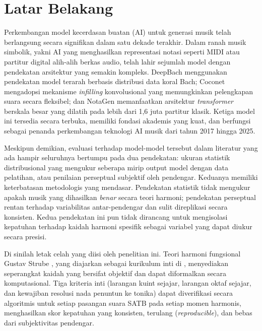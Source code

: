 \section{Latar Belakang}

Perkembangan model kecerdasan buatan (AI) untuk generasi musik telah berlangsung secara signifikan dalam satu dekade terakhir. Dalam ranah musik simbolik, yakni AI yang menghasilkan representasi notasi seperti MIDI atau partitur digital alih-alih berkas audio, telah lahir sejumlah model dengan pendekatan arsitektur yang semakin kompleks. DeepBach \parencite{hadjeres2017} menggunakan pendekatan model terarah berbasis distribusi data koral Bach; Coconet \parencite{huang2017} mengadopsi mekanisme \textit{infilling} konvolusional yang memungkinkan pelengkapan suara secara fleksibel; dan NotaGen \parencite{wang2025} memanfaatkan arsitektur \textit{transformer} berskala besar yang dilatih pada lebih dari 1,6 juta partitur klasik. Ketiga model ini tersedia secara terbuka, memiliki fondasi akademis yang kuat, dan berfungsi sebagai penanda perkembangan teknologi AI musik dari tahun 2017 hingga 2025.

Meskipun demikian, evaluasi terhadap model-model tersebut dalam literatur yang ada hampir seluruhnya bertumpu pada dua pendekatan: ukuran statistik distribusional yang mengukur seberapa mirip output model dengan data pelatihan, atau penilaian perseptual subjektif oleh pendengar. Keduanya memiliki keterbatasan metodologis yang mendasar. Pendekatan statistik tidak mengukur apakah musik yang dihasilkan \textit{benar} secara teori harmoni; pendekatan perseptual rentan terhadap variabilitas antar-pendengar dan sulit direplikasi secara konsisten. Kedua pendekatan ini pun tidak dirancang untuk mengisolasi kepatuhan terhadap kaidah harmoni spesifik sebagai variabel yang dapat diukur secara presisi.

Di sinilah letak celah yang diisi oleh penelitian ini. Teori harmoni fungsional Gustav Strube \parencite{strube1928}, yang diajarkan sebagai kurikulum inti di \programstudy{} \institutionname{}, menyediakan seperangkat kaidah yang bersifat objektif dan dapat diformalkan secara komputasional. Tiga kriteria inti (larangan kuint sejajar, larangan oktaf sejajar, dan kewajiban resolusi nada penuntun ke tonika) dapat diverifikasi secara algoritmis untuk setiap pasangan suara SATB pada setiap momen harmonis, menghasilkan skor kepatuhan yang konsisten, terulang (\textit{reproducible}), dan bebas dari subjektivitas pendengar.

